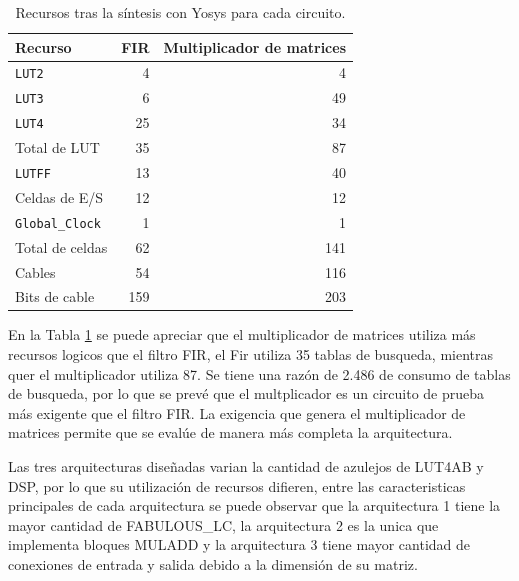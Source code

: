 \begin{table}[htbp]
  \centering
  \caption{Recursos tras la síntesis con Yosys para cada circuito.}
  \label{tab:sintesis-yosys}
  \begin{tabular}{lrr}
    \toprule
    Recurso & FIR & Multiplicador de matrices \\
    \midrule
    \texttt{LUT2}      & 4  & 4  \\
    \texttt{LUT3}      & 6  & 49 \\
    \texttt{LUT4}      & 25 & 34 \\
    Total de LUT       & 35 & 87 \\
    \texttt{LUTFF}     & 13 & 40 \\
    Celdas de E/S      & 12 & 12 \\
    \texttt{Global\_Clock} & 1 & 1 \\
    \midrule
    Total de celdas    & 62 & 141 \\
    Cables             & 54 & 116 \\
    Bits de cable      & 159 & 203 \\
    \bottomrule
  \end{tabular}
  \par\smallskip
\end{table}


En la Tabla \ref{tab:sintesis-yosys} se puede apreciar que el multiplicador de matrices utiliza más recursos logicos que el filtro FIR, el Fir utiliza 35 tablas de busqueda, mientras quer el multiplicador utiliza 87. Se tiene una razón de 2.486 de consumo de tablas de busqueda, por lo que se prevé que el multplicador es un circuito de prueba más exigente que el filtro FIR. La exigencia que genera el multiplicador de matrices permite que se evalúe de manera más completa la arquitectura.

Las tres arquitecturas diseñadas varian la cantidad de azulejos de LUT4AB y DSP, por lo que su utilización de recursos difieren, entre las caracteristicas principales de cada arquitectura se puede observar que la arquitectura 1 tiene la mayor cantidad de FABULOUS\_LC, la arquitectura 2 es la unica que implementa bloques MULADD y la arquitectura 3 tiene mayor cantidad de conexiones de entrada y salida debido a la dimensión de su matriz.


